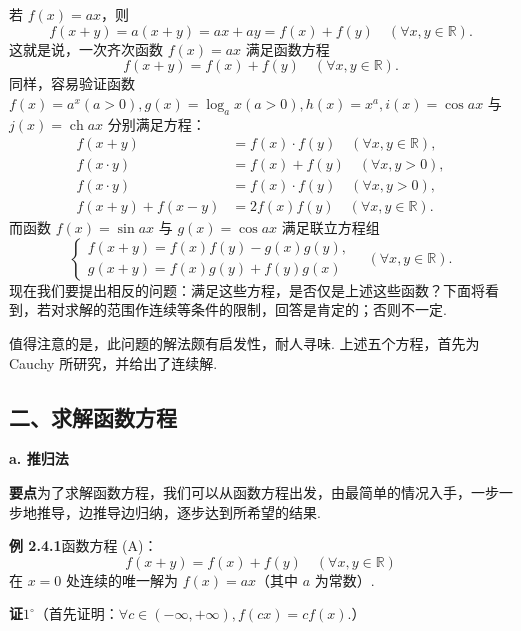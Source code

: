 \documentclass[UTF8, 12pt, fontset=fandol, oneside]{ctexart}
\begin{document}
若 $f(x)=ax$，则
\[
  f(x+y)=a(x+y)=ax+ay=f(x)+f(y)\quad(\forall x,y\in\mathbb{R}).
\]
这就是说，一次齐次函数 $f(x)=ax$ 满足函数方程
\[
  f(x+y)=f(x)+f(y)\quad(\forall x,y\in\mathbb{R}). \tag{A}
\]
同样，容易验证函数 $f(x)=a^x(a>0),g(x)=\log_a x(a>0),h(x)=x^a,i(x)=\cos ax$ 与 $j(x)=\operatorname{ch} ax$ 分别满足方程：
\begin{align}
f(x+y)&=f(x)\cdot f(y)\quad(\forall x,y\in\mathbb{R}), \tag{B}\\
f(x\cdot y)&=f(x)+f(y)\quad(\forall x,y>0), \tag{C}\\
f(x\cdot y)&=f(x)\cdot f(y)\quad(\forall x,y>0), \tag{D}\\
f(x+y)+f(x-y)&=2f(x)f(y)\quad(\forall x,y\in\mathbb{R}). \tag{E}
\end{align}
而函数 $f(x)=\sin ax$ 与 $g(x)=\cos ax$ 满足联立方程组
\[
\begin{cases}
f(x+y)=f(x)f(y)-g(x)g(y),\\
g(x+y)=f(x)g(y)+f(y)g(x)
\end{cases}
\quad(\forall x,y\in\mathbb{R}). \tag{F}
\]
现在我们要提出相反的问题：满足这些方程，是否仅是上述这些函数？下面将看到，若对求解的范围作连续等条件的限制，回答是肯定的；否则不一定.

值得注意的是，此问题的解法颇有启发性，耐人寻味. 上述五个方程，首先为 Cauchy 所研究，并给出了连续解.

\subsection*{二、求解函数方程}

\noindent\textbf{a. 推归法}

\noindent\textbf{要点}\quad 为了求解函数方程，我们可以从函数方程出发，由最简单的情况入手，一步一步地推导，边推导边归纳，逐步达到所希望的结果.

\noindent\textbf{例 2.4.1}\quad 函数方程 (A)：
\[
  f(x+y)=f(x)+f(y)\quad(\forall x,y\in\mathbb{R})
\]
在 $x=0$ 处连续的唯一解为 $f(x)=ax$（其中 $a$ 为常数）.

\noindent\textbf{证}\quad $1^\circ$（首先证明：$\forall c\in(-\infty,+\infty),f(cx)=cf(x)$.）
\end{document}
